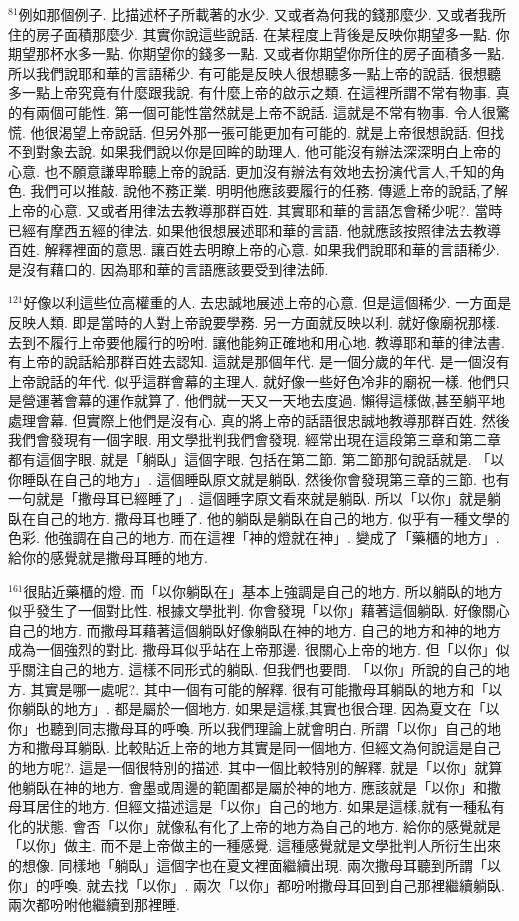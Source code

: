 \documentclass{book}
\begin{document}
$^{81}$例如那個例子.
比描述杯子所載著的水少.
又或者為何我的錢那麼少.
又或者我所住的房子面積那麼少.
其實你說這些說話.
在某程度上背後是反映你期望多一點.
你期望那杯水多一點.
你期望你的錢多一點.
又或者你期望你所住的房子面積多一點.
所以我們說耶和華的言語稀少.
有可能是反映人很想聽多一點上帝的說話.
很想聽多一點上帝究竟有什麼跟我說.
有什麼上帝的啟示之類.
在這裡所謂不常有物事.
真的有兩個可能性.
第一個可能性當然就是上帝不說話.
這就是不常有物事.
令人很驚慌.
他很渴望上帝說話.
但另外那一張可能更加有可能的.
就是上帝很想說話.
但找不到對象去說.
如果我們說以你是回眸的助理人.
他可能沒有辦法深深明白上帝的心意.
也不願意謙卑聆聽上帝的說話.
更加沒有辦法有效地去扮演代言人,千知的角色.
我們可以推敲.
說他不務正業.
明明他應該要履行的任務.
傳遞上帝的說話,了解上帝的心意.
又或者用律法去教導那群百姓.
其實耶和華的言語怎會稀少呢?.
當時已經有摩西五經的律法.
如果他很想展述耶和華的言語.
他就應該按照律法去教導百姓.
解釋裡面的意思.
讓百姓去明瞭上帝的心意.
如果我們說耶和華的言語稀少.
是沒有藉口的.
因為耶和華的言語應該要受到律法師.

$^{121}$好像以利這些位高權重的人.
去忠誠地展述上帝的心意.
但是這個稀少.
一方面是反映人類.
即是當時的人對上帝說要學務.
另一方面就反映以利.
就好像廟祝那樣.
去到不履行上帝要他履行的吩咐.
讓他能夠正確地和用心地.
教導耶和華的律法書.
有上帝的說話給那群百姓去認知.
這就是那個年代.
是一個分歲的年代.
是一個沒有上帝說話的年代.
似乎這群會幕的主理人.
就好像一些好色冷非的廟祝一樣.
他們只是營運著會幕的運作就算了.
他們就一天又一天地去度過.
懶得這樣做,甚至躺平地處理會幕.
但實際上他們是沒有心.
真的將上帝的話語很忠誠地教導那群百姓.
然後我們會發現有一個字眼.
用文學批判我們會發現.
經常出現在這段第三章和第二章都有這個字眼.
就是「躺臥」這個字眼.
包括在第二節.
第二節那句說話就是.
「以你睡臥在自己的地方」.
這個睡臥原文就是躺臥.
然後你會發現第三章的三節.
也有一句就是「撒母耳已經睡了」.
這個睡字原文看來就是躺臥.
所以「以你」就是躺臥在自己的地方.
撒母耳也睡了.
他的躺臥是躺臥在自己的地方.
似乎有一種文學的色彩.
他強調在自己的地方.
而在這裡「神的燈就在神」.
變成了「藥櫃的地方」.
給你的感覺就是撒母耳睡的地方.

$^{161}$很貼近藥櫃的燈.
而「以你躺臥在」基本上強調是自己的地方.
所以躺臥的地方似乎發生了一個對比性.
根據文學批判.
你會發現「以你」藉著這個躺臥.
好像關心自己的地方.
而撒母耳藉著這個躺臥好像躺臥在神的地方.
自己的地方和神的地方成為一個強烈的對比.
撒母耳似乎站在上帝那邊.
很關心上帝的地方.
但「以你」似乎關注自己的地方.
這樣不同形式的躺臥.
但我們也要問.
「以你」所說的自己的地方.
其實是哪一處呢?.
其中一個有可能的解釋.
很有可能撒母耳躺臥的地方和「以你躺臥的地方」.
都是屬於一個地方.
如果是這樣,其實也很合理.
因為夏文在「以你」也聽到同志撒母耳的呼喚.
所以我們理論上就會明白.
所謂「以你」自己的地方和撒母耳躺臥.
比較貼近上帝的地方其實是同一個地方.
但經文為何說這是自己的地方呢?.
這是一個很特別的描述.
其中一個比較特別的解釋.
就是「以你」就算他躺臥在神的地方.
會墨或周邊的範圍都是屬於神的地方.
應該就是「以你」和撒母耳居住的地方.
但經文描述這是「以你」自己的地方.
如果是這樣,就有一種私有化的狀態.
會否「以你」就像私有化了上帝的地方為自己的地方.
給你的感覺就是「以你」做主.
而不是上帝做主的一種感覺.
這種感覺就是文學批判人所衍生出來的想像.
同樣地「躺臥」這個字也在夏文裡面繼續出現.
兩次撒母耳聽到所謂「以你」的呼喚.
就去找「以你」.
兩次「以你」都吩咐撒母耳回到自己那裡繼續躺臥.
兩次都吩咐他繼續到那裡睡.
\end{document}
